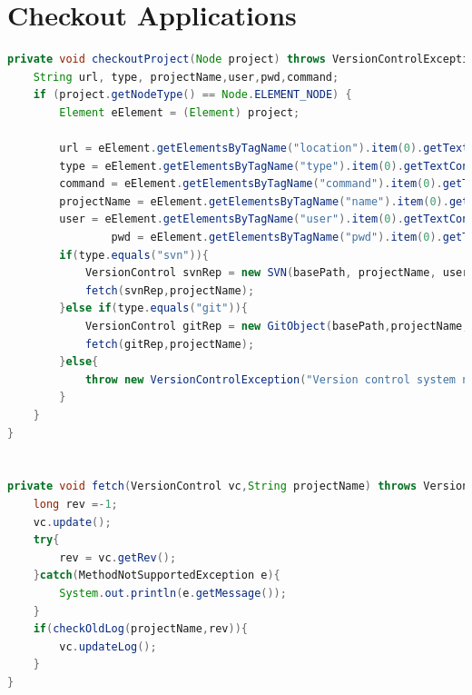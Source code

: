\documentclass{article}
\begin{document}
\newpage
\section{Checkout Applications}
\label{AppendixD}


\begin{lstlisting}[frame=single ,language=Java,showstringspaces=false]
private void checkoutProject(Node project) throws VersionControlException{
	String url, type, projectName,user,pwd,command;
	if (project.getNodeType() == Node.ELEMENT_NODE) {
		Element eElement = (Element) project;

		url = eElement.getElementsByTagName("location").item(0).getTextContent();
		type = eElement.getElementsByTagName("type").item(0).getTextContent();
		command = eElement.getElementsByTagName("command").item(0).getTextContent();
		projectName = eElement.getElementsByTagName("name").item(0).getTextContent();
		user = eElement.getElementsByTagName("user").item(0).getTextContent();
                pwd = eElement.getElementsByTagName("pwd").item(0).getTextContent();	
		if(type.equals("svn")){
			VersionControl svnRep = new SVN(basePath, projectName, user,pwd,url,command);
			fetch(svnRep,projectName);				
		}else if(type.equals("git")){			
			VersionControl gitRep = new GitObject(basePath,projectName,url,user,pwd);
			fetch(gitRep,projectName);				
		}else{
			throw new VersionControlException("Version control system not found");
		}
	}	
}

	
private void fetch(VersionControl vc,String projectName) throws VersionControlException{
	long rev =-1;
	vc.update();
	try{	
		rev = vc.getRev();
	}catch(MethodNotSupportedException e){
		System.out.println(e.getMessage());
	}
	if(checkOldLog(projectName,rev)){
		vc.updateLog();
	}
}
\end{lstlisting}
\end{document}
